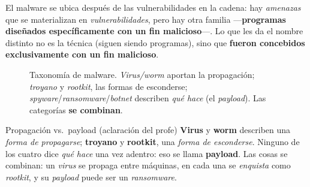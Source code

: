 \documentclass[11pt,a4paper]{article}
\begin{document}
\begin{slidebox}
El malware se ubica después de las vulnerabilidades en la cadena: hay \emph{amenazas} que se
materializan en \emph{vulnerabilidades}, pero hay otra familia —\textbf{programas diseñados
específicamente con un fin malicioso}—. Lo que les da el nombre distinto no es la técnica
(siguen siendo programas), sino que \textbf{fueron concebidos exclusivamente con un fin
malicioso}.
\end{slidebox}

\begin{figure}[h]
\centering
{}
\caption{Taxonomía de malware. \emph{Virus/worm} aportan la propagación; \emph{troyano} y
\emph{rootkit}, las formas de esconderse; \emph{spyware}/\emph{ransomware}/\emph{botnet}
describen \emph{qué hace} (el \emph{payload}). Las categorías \textbf{se combinan}.}
\end{figure}

\begin{practbox}{Propagación vs.\ payload (aclaración del profe)}
\textbf{Virus} y \textbf{worm} describen una \emph{forma de propagarse}; \textbf{troyano} y
\textbf{rootkit}, una \emph{forma de esconderse}. Ninguno de los cuatro dice \emph{qué hace} una
vez adentro: eso se llama \textbf{payload}. Las cosas se combinan: un \emph{virus} se propaga
entre máquinas, en cada una se \emph{enquista} como \emph{rootkit}, y su \emph{payload} puede ser
un \emph{ransomware}.
\end{practbox}
\end{document}
